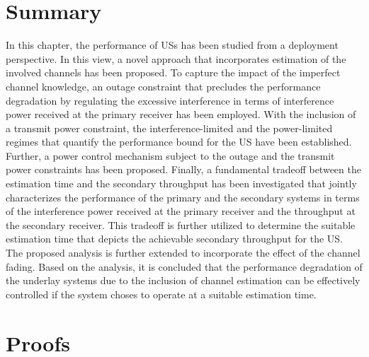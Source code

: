 {\section{Summary} \label{sec:conc}
In this chapter, the performance of USs has been studied from a deployment perspective. In this view, a novel approach that incorporates estimation of the involved channels has been proposed. To capture the impact of the imperfect channel knowledge, an outage constraint that precludes the performance degradation by regulating the excessive interference in terms of interference power received at the primary receiver has been employed. With the inclusion of a transmit power constraint, the interference-limited and the power-limited regimes that quantify the performance bound for the US have been established. Further, a power control mechanism subject to the outage and the transmit power constraints has been proposed. Finally, a fundamental tradeoff between the estimation time and the secondary throughput has been investigated that jointly characterizes the performance of the primary and the secondary systems in terms of the interference power received at the primary receiver and the throughput at the secondary receiver. This tradeoff is further utilized to determine the suitable estimation time that depicts the achievable secondary throughput for the US. The proposed analysis is further extended to incorporate the effect of the channel fading. Based on the analysis, it is concluded that the performance degradation of the underlay systems due to the inclusion of channel estimation can be effectively controlled if the system choses to operate at a suitable estimation time. %

\section{Proofs}
}
